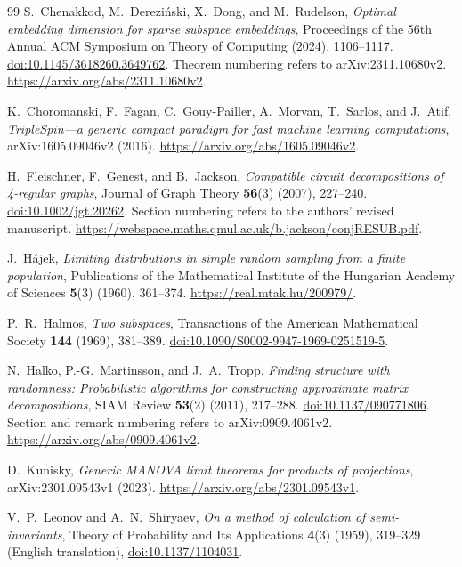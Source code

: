 \documentclass[11pt]{article}
\theoremstyle{definition}
\theoremstyle{remark}
\theoremstyle{plain}
\begin{document}
\begin{thebibliography}{99}
S.~Chenakkod, M.~Derezi\'nski, X.~Dong, and M.~Rudelson,
\emph{Optimal embedding dimension for sparse subspace embeddings},
Proceedings of the 56th Annual ACM Symposium on Theory of Computing
(2024), 1106--1117.
\href{https://doi.org/10.1145/3618260.3649762}{doi:10.1145/3618260.3649762}.
Theorem numbering refers to arXiv:2311.10680v2.
\url{https://arxiv.org/abs/2311.10680v2}.

K.~Choromanski, F.~Fagan, C.~Gouy-Pailler, A.~Morvan,
T.~Sarlos, and J.~Atif,
\emph{TripleSpin---a generic compact paradigm for fast machine
learning computations}, arXiv:1605.09046v2 (2016).
\url{https://arxiv.org/abs/1605.09046v2}.

H.~Fleischner, F.~Genest, and B.~Jackson,
\emph{Compatible circuit decompositions of 4-regular graphs},
Journal of Graph Theory \textbf{56}(3) (2007), 227--240.
\href{https://doi.org/10.1002/jgt.20262}{doi:10.1002/jgt.20262}.
Section numbering refers to the authors' revised manuscript.
\url{https://webspace.maths.qmul.ac.uk/b.jackson/conjRESUB.pdf}.

J.~H\'ajek,
\emph{Limiting distributions in simple random sampling from a
finite population},
Publications of the Mathematical Institute of the Hungarian
Academy of Sciences \textbf{5}(3) (1960), 361--374.
\url{https://real.mtak.hu/200979/}.

P.~R.~Halmos,
\emph{Two subspaces},
Transactions of the American Mathematical Society \textbf{144}
(1969), 381--389.
\href{https://doi.org/10.1090/S0002-9947-1969-0251519-5}{doi:10.1090/S0002-9947-1969-0251519-5}.

N.~Halko, P.-G.~Martinsson, and J.~A.~Tropp,
\emph{Finding structure with randomness: Probabilistic algorithms
for constructing approximate matrix decompositions},
SIAM Review \textbf{53}(2) (2011), 217--288.
\href{https://doi.org/10.1137/090771806}{doi:10.1137/090771806}.
Section and remark numbering refers to arXiv:0909.4061v2.
\url{https://arxiv.org/abs/0909.4061v2}.

D.~Kunisky,
\emph{Generic MANOVA limit theorems for products of projections},
arXiv:2301.09543v1 (2023).
\url{https://arxiv.org/abs/2301.09543v1}.

V.~P.~Leonov and A.~N.~Shiryaev,
\emph{On a method of calculation of semi-invariants},
Theory of Probability and Its Applications
\textbf{4}(3) (1959), 319--329 (English translation),
\href{https://doi.org/10.1137/1104031}{doi:10.1137/1104031}.


\end{thebibliography}
\end{document}
